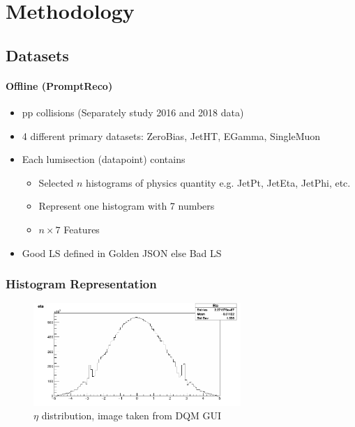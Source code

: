 \chapter{Methodology}

\section{Datasets}

\subsubsection{Offline (PromptReco)}
\begin{itemize}
    \item pp collisions (Separately study 2016 and 2018 data)
    \item 4 different primary datasets: ZeroBias, JetHT, EGamma, SingleMuon
    \item Each lumisection (datapoint) contains
    \begin{itemize}
        \item Selected $n$ histograms of physics quantity e.g. JetPt, JetEta, JetPhi, etc.
        \item Represent one histogram with 7 numbers
        \item $n \times 7$ Features
    \end{itemize}
    \item Good LS defined in Golden JSON else Bad LS
\end{itemize}

\subsection{Histogram Representation}
\begin{figure}[h!]
    \centering
    \includegraphics[width=0.7\textwidth]{images/ex_eta_dist.png}
    \caption{$\eta$ distribution, image taken from DQM GUI}
    \label{fig:ex_eta_dist}
\end{figure}

